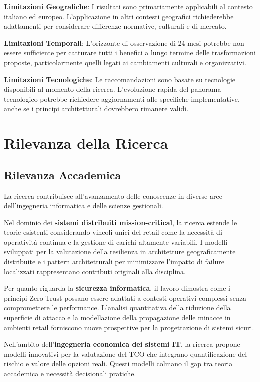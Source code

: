 \textbf{Limitazioni Geografiche}: I risultati sono primariamente applicabili al contesto italiano ed europeo. L'applicazione in altri contesti geografici richiederebbe adattamenti per considerare differenze normative, culturali e di mercato.

\textbf{Limitazioni Temporali}: L'orizzonte di osservazione di 24 mesi potrebbe non essere sufficiente per catturare tutti i benefici a lungo termine delle trasformazioni proposte, particolarmente quelli legati ai cambiamenti culturali e organizzativi.

\textbf{Limitazioni Tecnologiche}: Le raccomandazioni sono basate su tecnologie disponibili al momento della ricerca. L'evoluzione rapida del panorama tecnologico potrebbe richiedere aggiornamenti alle specifiche implementative, anche se i principi architetturali dovrebbero rimanere validi.

\section{Rilevanza della Ricerca}

\subsection{Rilevanza Accademica}

La ricerca contribuisce all'avanzamento delle conoscenze in diverse aree dell'ingegneria informatica e delle scienze gestionali.

Nel dominio dei \textbf{sistemi distribuiti mission-critical}, la ricerca estende le teorie esistenti considerando vincoli unici del retail come la necessità di operatività continua e la gestione di carichi altamente variabili. I modelli sviluppati per la valutazione della resilienza in architetture geograficamente distribuite e i pattern architetturali per minimizzare l'impatto di failure localizzati rappresentano contributi originali alla disciplina.

Per quanto riguarda la \textbf{sicurezza informatica}, il lavoro dimostra come i principi Zero Trust possano essere adattati a contesti operativi complessi senza compromettere le performance. L'analisi quantitativa della riduzione della superficie di attacco e la modellazione della propagazione delle minacce in ambienti retail forniscono nuove prospettive per la progettazione di sistemi sicuri.

Nell'ambito dell'\textbf{ingegneria economica dei sistemi IT}, la ricerca propone modelli innovativi per la valutazione del TCO che integrano quantificazione del rischio e valore delle opzioni reali. Questi modelli colmano il gap tra teoria accademica e necessità decisionali pratiche.

